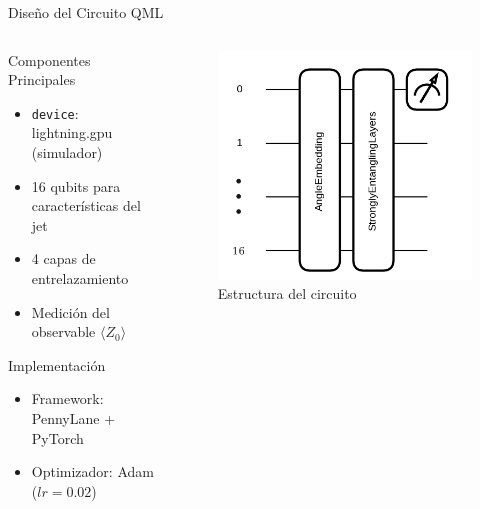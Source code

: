 \documentclass[aspectratio=43]{beamer}
\begin{document}
\begin{frame}{Diseño del Circuito QML}
  \begin{columns}
    \begin{column}{0.55\textwidth}
      \begin{block}{Componentes Principales}
        \begin{itemize}
          \item \texttt{device}: \alert{lightning.gpu} (simulador)
          \item 16 qubits para características del jet
          \item 4 capas de entrelazamiento
          \item Medición del observable $\langle Z_0\rangle$
        \end{itemize}
      \end{block}
      \begin{alertblock}{Implementación}
        \begin{itemize}
          \item Framework: PennyLane + PyTorch
          \item Optimizador: Adam ($lr=0.02$)
        \end{itemize}
      \end{alertblock}
    \end{column}
    \begin{column}{0.45\textwidth}
      \begin{figure}
        \includegraphics[width=\textwidth]{circuito.png}
        \caption{Estructura del circuito}
      \end{figure}
    \end{column}
  \end{columns}
\end{frame}
\end{document}
